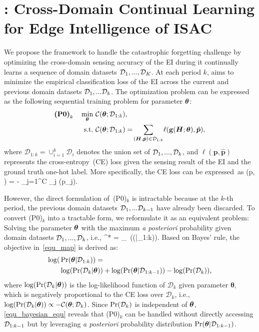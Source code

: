 \section{\name: Cross-Domain Continual Learning for Edge Intelligence of ISAC}\label{sec_prob}

We propose the \name framework to handle the catastrophic forgetting challenge by optimizing the cross-domain sensing accuracy of the EI during it continually learns a sequence of domain datasets $\mathcal{D}_1,...,\mathcal{D}_K$.
At each period $k$, \name aims to minimize the empirical classification loss of the EI across the current and previous domain datasets $\mathcal{D}_1,...\mathcal{D}_{k}$.
The optimization problem can be expressed as the following sequential training problem for parameter $\bm\theta$:
\begin{align}
\text{\textbf{(P0)}}_k\quad\min_{\bm\theta}~&\mathcal{C}(\bm\theta;\mathcal{D}_{1:k}), \nonumber\\
\text{s.t.}~&\mathcal{C}(\bm\theta;\mathcal{D}_{1:k}) =\!\sum_{(\bm H, \hat{\bm p} )\in\mathcal{D}_{1:k}} \!{\ell (\mathbf{g}(\bm H;\bm\theta), \hat{\bm p})}, \nonumber
\end{align}
where $\mathcal D_{1:k}=\cup_{i=1}^k \mathcal D_i$ denotes the union set of $\mathcal{D}_1,...,\mathcal{D}_k$,
and $\ell(\bm p, \hat{\bm p})$ represents the cross-entropy~(CE) loss given the sensing result of the EI and the ground truth one-hot label.
More specifically, the CE loss can be expressed~as
\beq
\ell(\bm p, ) = - \sum_{j=1}^C _j \log (p_j).
\eeq

However, the direct formulation of~(P0)$_k$ is intractable because at the $k$-th period, the previous domain datasets $\mathcal{D}_1, ...\mathcal{D}_{k-1}$ have already been discarded.
To convert (P0)$_k$ into a tractable form, we reformulate it as an equivalent problem: Solving the parameter $\bm\theta$ with the maximum \emph{a posteriori} probability given domain datasets $\mathcal{D}_1,...,\mathcal{D}_k$, i.e.,
\beq
\label{equ_map}
\btheta^* = \arg\max_{\bm\theta}~\log(\Pr(\bm\theta|\cD_{1:k})).
\eeq
%
Based on Bayes' rule, the objective in~\eqref{equ_map} is derived as:
\begin{align}
\label{equ_bayesian_equ}
\log(&\operatorname{Pr}(\bm\theta|\mathcal{D}_{1:k})) =  \\
& \log(\operatorname{Pr}(\mathcal{D}_{k}|\bm\theta)) +  \log(\operatorname{Pr}(\bm\theta|\mathcal{D}_{1:k-1})) - \log(\operatorname{Pr}(\mathcal D_k)), \nonumber
\end{align}
where $\log(\operatorname{Pr}(\mathcal{D}_{k}|\bm\theta))$ is the log-likelihood function of $\mathcal D_k$ given parameter $\bm \theta$, which is negatively proportional to the CE loss over $\mathcal D_k$, i.e., $\log(\operatorname{Pr}(\mathcal{D}_{k}|\bm\theta))\propto-\mathcal{C}(\bm\theta;\mathcal{D}_k)$.
Since $\operatorname{Pr}(\mathcal{D}_k)$ is independent of $\bm\theta$, \eqref{equ_bayesian_equ} reveals that (P0)$_k$ can be handled without directly accessing $\mathcal{D}_{1:k-1}$ but by leveraging \emph{a posteriori} probability distribution $\operatorname{Pr}(\bm\theta|\mathcal{D}_{1:k-1})$. 

